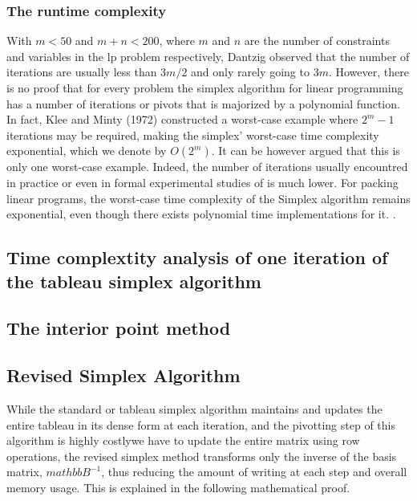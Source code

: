 \subsubsection{The runtime complexity}
With $m<50$ and $m+n<200$, where $m$ and $n$ are the number of constraints and variables in the \gls{lp}
problem respectively, Dantzig observed that the number of iterations are usually less than $3m/2$
and only rarely going to $3m$. However, there is no proof that for every
problem the simplex algorithm for
linear programming has a number of iterations or pivots that
is majorized by a polynomial function.
In fact, Klee and Minty (1972) \parencite{klee1972good} constructed a worst-case example where
$2^m -1$ iterations may be required, making the simplex'
worst-case time complexity exponential, which we denote by \( O(2^m) \).
It can be however argued that this is only one worst-case example. Indeed, the number
of iterations usually encountred in practice or even in formal experimental studies of is much lower.
For packing linear programs, the worst-case time complexity of the Simplex algorithm
remains exponential, even though there exists polynomial time implementations for it.
\parencite{stille2010solution}.

\subsection{Time complextity analysis of one iteration of the tableau simplex algorithm}
\subsection{The interior point method}

\subsection{Revised Simplex Algorithm}
While the standard or tableau simplex algorithm maintains and updates the entire tableau in its
dense form at each iteration, and the pivotting step of this algorithm is 
highly costlywe have to update the entire matrix
using row operations, the revised simplex
method transforms only the inverse of the basis matrix, $mathbb{B}^{-1}$, thus
reducing the amount of writing at each step and overall memory usage.
This is explained in the following mathematical proof.
